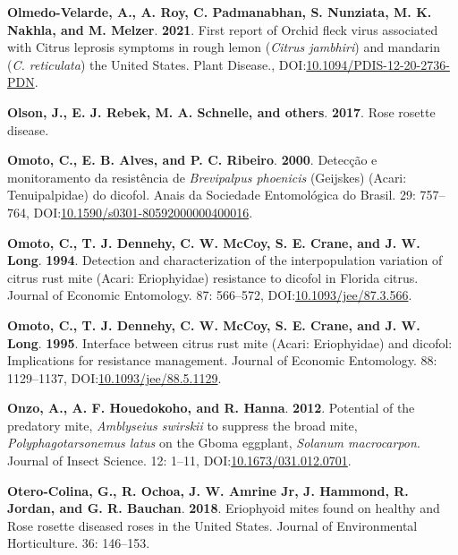 \documentclass[12pt,final,CPage]{ufthesis}
\newlength{\cslhangindent}
\newenvironment{CSLReferences}[2] %
{%
	\setlength{\parindent}{0pt}
	\ifodd #1 \everypar{\setlength{\hangindent}{\cslhangindent}}\ignorespaces\fi
	\ifnum #2 > 0
	\setlength{\parskip}{#2\baselineskip}
	\fi
}%
{}
\begin{document}
{\begin{CSLReferences}{1}{0}
  \leavevmode{}%
  \textbf{Olmedo-Velarde, A., A. Roy, C. Padmanabhan, S. Nunziata, M. K. Nakhla, and M. Melzer}. \textbf{2021}. First report of {Orchid fleck virus} associated with {Citrus leprosis} symptoms in rough lemon ({\emph{Citrus jambhiri}}) and mandarin ({\emph{C. reticulata}}) the {United States}. Plant Disease., DOI:\href{https://doi.org/10.1094/PDIS-12-20-2736-PDN}{10.1094/PDIS-12-20-2736-PDN}.

  \leavevmode{}%
  \textbf{Olson, J., E. J. Rebek, M. A. Schnelle, and others}. \textbf{2017}. Rose rosette disease.

  \leavevmode{}%
  \textbf{Omoto, C., E. B. Alves, and P. C. Ribeiro}. \textbf{2000}. Detec{ç}{ã}o e monitoramento da resist{ê}ncia de {\emph{Brevipalpus phoenicis}} ({Geijskes}) ({Acari}: {Tenuipalpidae}) do dicofol. Anais da Sociedade Entomol{ó}gica do Brasil. 29: 757--764, DOI:\href{https://doi.org/10.1590/s0301-80592000000400016}{10.1590/s0301-80592000000400016}.

  \leavevmode{}%
  \textbf{Omoto, C., T. J. Dennehy, C. W. McCoy, S. E. Crane, and J. W. Long}. \textbf{1994}. Detection and characterization of the interpopulation variation of citrus rust mite ({Acari}: {Eriophyidae}) resistance to dicofol in {Florida} citrus. Journal of Economic Entomology. 87: 566--572, DOI:\href{https://doi.org/10.1093/jee/87.3.566}{10.1093/jee/87.3.566}.

  \leavevmode{}%
  \textbf{Omoto, C., T. J. Dennehy, C. W. McCoy, S. E. Crane, and J. W. Long}. \textbf{1995}. Interface between citrus rust mite ({Acari}: {Eriophyidae}) and dicofol: Implications for resistance management. Journal of Economic Entomology. 88: 1129--1137, DOI:\href{https://doi.org/10.1093/jee/88.5.1129}{10.1093/jee/88.5.1129}.

  \leavevmode{}%
  \textbf{Onzo, A., A. F. Houedokoho, and R. Hanna}. \textbf{2012}. Potential of the predatory mite, {\emph{Amblyseius swirskii}} to suppress the broad mite, {\emph{Polyphagotarsonemus latus}} on the {Gboma eggplant}, {\emph{Solanum macrocarpon}}. Journal of Insect Science. 12: 1--11, DOI:\href{https://doi.org/10.1673/031.012.0701}{10.1673/031.012.0701}.

  \leavevmode{}%
  \textbf{Otero-Colina, G., R. Ochoa, J. W. Amrine Jr, J. Hammond, R. Jordan, and G. R. Bauchan}. \textbf{2018}. Eriophyoid mites found on healthy and {Rose rosette diseased} roses in the {United States}. Journal of Environmental Horticulture. 36: 146--153.


\end{CSLReferences}}
\end{document}
